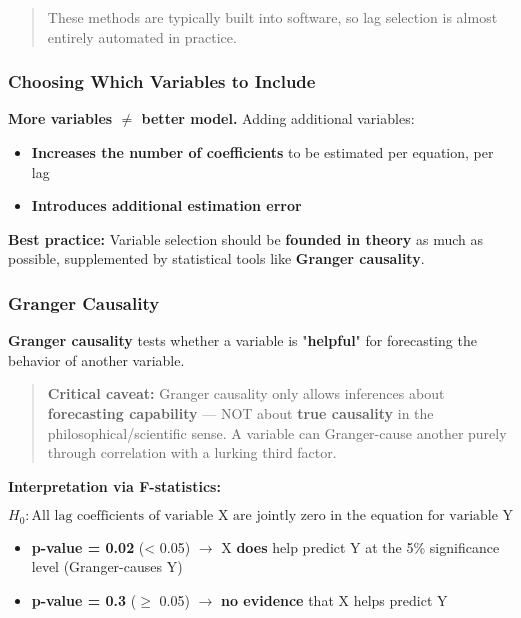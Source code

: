 \documentclass[12pt,openany]{book}
\begin{document}
\begin{quote}
These methods are typically built into software, so lag selection is almost entirely automated in practice.\par

\end{quote}

\subsubsection{Choosing Which Variables to Include}

\textbf{More variables \(\neq\) better model.} Adding additional variables:
\begin{itemize}[leftmargin=*]
    \item \textbf{Increases the number of coefficients} to be estimated per equation, per lag
    \item \textbf{Introduces additional estimation error}
\end{itemize}

\textbf{Best practice:} Variable selection should be \textbf{founded in theory} as much as possible, supplemented by statistical tools like \textbf{Granger causality}.

\subsubsection{Granger Causality}

\textbf{Granger causality} tests whether a variable is "\textbf{helpful}" for forecasting the behavior of another variable.

\begin{quote}
\textbf{Critical caveat:} Granger causality only allows inferences about \textbf{forecasting capability} --- NOT about \textbf{true causality} in the philosophical/scientific sense. A variable can Granger-cause another purely through correlation with a lurking third factor.\par

\end{quote}

\textbf{Interpretation via F-statistics:}

\begin{equation*}
    H_0: \text{All lag coefficients of variable X are jointly zero in the equation for variable Y}
\end{equation*}

\begin{itemize}[leftmargin=*]
    \item \textbf{p-value = 0.02} (< 0.05) \(\rightarrow\) X \textbf{does} help predict Y at the 5\% significance level (Granger-causes Y)
    \item \textbf{p-value = 0.3} (\(\geq\) 0.05) \(\rightarrow\) \textbf{no evidence} that X helps predict Y
\end{itemize}
\end{document}
